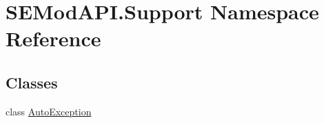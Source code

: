 \hypertarget{namespace_s_e_mod_a_p_i_1_1_support}{}\section{S\+E\+Mod\+A\+P\+I.\+Support Namespace Reference}
\label{namespace_s_e_mod_a_p_i_1_1_support}
\subsection*{Classes}
\begin{DoxyCompactItemize}
\item 
class \hyperlink{class_s_e_mod_a_p_i_1_1_support_1_1_auto_exception}{Auto\+Exception}
\end{DoxyCompactItemize}
